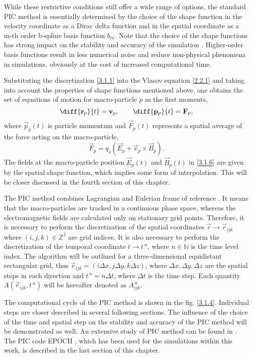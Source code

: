 While these restrictive conditions still offer a wide range of options, the standard PIC method is essentially determined by the choice of the shape function in the velocity coordinate as a Dirac delta function and in the spatial coordinate as a m-th order b-spline basis function $ b_{m} $. Note that the choice of the shape functions has strong impact on the stability and accuracy of the simulation \cite{birdsall}. Higher-order basis functions result in less numerical noise and reduce non-physical phenomena in simulations, obviously at the cost of increased computational time.

Substituting the discretization \ref{3.1.1} into the Vlasov equation \ref{2.2.1} and taking into account the properties of shape functions mentioned above, one obtains the set of equations of motion for macro-particle $ p $ as the first moments,
\begin{equation}
\label{3.1.5}
\diff{\vec{r}_{p}}{t} = \vec{v}_{p}, \qquad \diff{\vec{p}_{p}}{t} = \vec{F}_{p},
\end{equation}
where $ \vec{p}_{p} \left( t\right) $ is particle momentum and $ \vec{F}_p \left( t\right) $ represents a spatial average of the force acting on the macro-particle,
\begin{equation}
\label{3.1.6}
\vec{F}_p = q_s \left(\vec{E}_p + \vec{v}_p \times \vec{B}_p \right).
\end{equation}
The fields at the macro-particle position $ \vec{E}_p \left( t\right) $ and $ \vec{B}_p \left( t\right) $ in \ref{3.1.6} are given by the spatial shape function, which implies some form of interpolation. This will be closer discussed in the fourth section of this chapter.

The PIC method combines Lagrangian and Eulerian frame of reference \cite{Dawson1983}. It means that the macro-particles are tracked in a continuous phase space, whereas the electromagnetic fields are calculated only on stationary grid points. Therefore, it is necessary to perform the discretization of the spatial coordinates $ \vec{r} \rightarrow \vec{r}_{i j k} $ where $ (i,j,k) \in \mathbb{Z}^{3} $ are grid indices. It is also necessary to perform the discretization of the temporal coordinate $ t \rightarrow t^{\,n} $, where $ n \in \mathbb{N} $ is the time level index. The algorithm will be outlined for a three-dimensional equidistant rectangular grid, thus $ \vec{r}_{i j k} = \left(i \Delta x, j \Delta y, k \Delta z\right) $, where $ \Delta x, \Delta y, \Delta z $ are the spatial steps in each direction and $ t^{\,n} = n\Delta t $, where $ \Delta t $ is the time step. Each quantity $ A \left(\vec{r}_{i j k}, t^{\,n} \right) $ will be hereafter denoted as $ A_{ijk}^{\,n} $.

The computational cycle of the PIC method is shown in the fig. \ref{3.1.4}. Individual steps are closer described in several following sections. The influence of the choice of the time and spatial step on the stability and accuracy of the PIC method will be demonstrated as well. An extensive study of PIC method can be found in \cite{birdsall, hockney}. The PIC code EPOCH \cite{bennett}, which has been used for the simulations within this work, is described in the last section of this chapter.